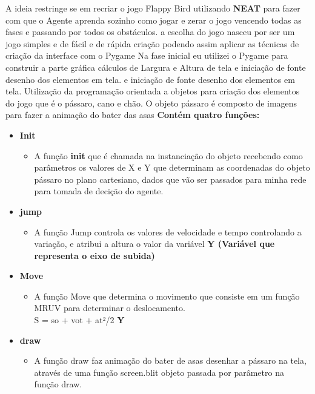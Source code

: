 A ideia restringe se em recriar o jogo Flappy Bird utilizando \textbf{NEAT} para fazer com que o Agente aprenda sozinho como jogar e zerar o jogo vencendo todas as fases e passando por todos os obstáculos. a escolha do jogo nasceu por ser um jogo simples e de fácil e de rápida criação podendo assim aplicar as técnicas de criação da interface com o Pygame 
Na fase inicial eu utilizei o Pygame  para construir a parte gráfica cálculos de  Largura e Altura de tela e iniciação de fonte  desenho dos elementos em tela. e iniciação de fonte  desenho dos elementos em tela.
Utilização da programação orientada a objetos para criação dos elementos do jogo 
que é o pássaro, cano e chão.
O objeto pássaro é composto de imagens para fazer a animação do bater das asas
\textbf{Contém quatro funções:}
\begin{itemize}
    \item \textbf{Init}
    \begin{itemize}
    \item A função \textbf{init} que é chamada na instanciação do objeto recebendo como parâmetros 
os valores de X e Y que determinam as coordenadas do objeto pássaro no plano cartesiano, dados que vão ser passados para minha rede para tomada de decição do agente.
\end{itemize}


\item \textbf{jump}
    \begin{itemize}
    \item A função Jump controla os valores de velocidade e tempo controlando a variação, e atribui a altura o valor da variável \textbf{Y (Variável que representa o eixo de subida)}  
\end{itemize}

 

\item \textbf{Move}
    \begin{itemize}
    \item A função Move que determina o movimento que consiste em um função MRUV para determinar o deslocamento.\\
S = so + vot + at²/2
 \textbf{Y}
\end{itemize}

\item \textbf{draw}
    \begin{itemize}
    \item A função draw faz animação do bater de asas desenhar a pássaro na tela, através de uma função screen.blit objeto passada por parâmetro na função draw.
\end{itemize}
\end{itemize}

